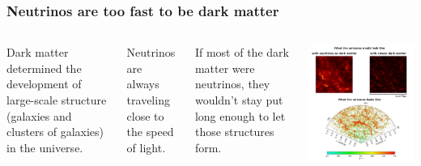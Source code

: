 \documentclass[compress]{beamer}
\begin{document}
\begin{frame}
\frametitle{Neutrinos are too fast to be dark matter}

\begin{columns}
Dark matter determined the development of large-scale structure
(galaxies and clusters of galaxies) in the universe.

\vspace{0.5 cm}
Neutrinos are always traveling close
to the speed of light.

\vspace{0.5 cm}
If most of the dark matter were neutrinos, they wouldn't stay put long
enough to let those structures form.

\includegraphics[width=\linewidth]{pictures/neutrinos_and_lss.png}
\end{columns}
\end{frame}
\end{document}
